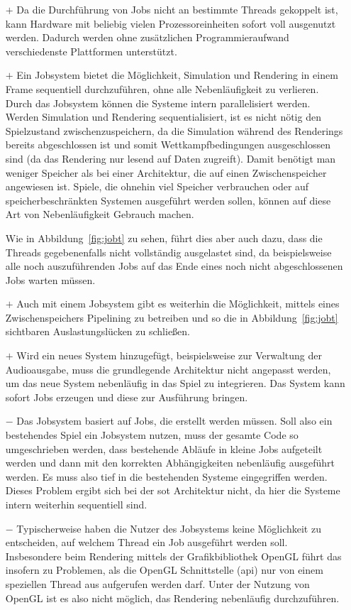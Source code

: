 \begin{itemize}
	\item[$+$]  Da die Durchführung von Jobs nicht an bestimmte Threads gekoppelt ist, kann Hardware mit beliebig vielen Prozessoreinheiten sofort voll ausgenutzt werden. Dadurch werden ohne zusätzlichen Programmieraufwand verschiedenste Plattformen unterstützt.
	\item[$+$] Ein Jobsystem bietet die Möglichkeit, Simulation und Rendering in einem Frame sequentiell durchzuführen, ohne alle Nebenläufigkeit zu verlieren. Durch das Jobsystem können die Systeme intern parallelisiert werden. Werden Simulation und Rendering sequentialisiert, ist es nicht nötig den Spielzustand zwischenzuspeichern, da die Simulation während des Renderings bereits abgeschlossen ist und somit Wettkampfbedingungen ausgeschlossen sind (da das Rendering nur lesend auf Daten zugreift). Damit benötigt man weniger Speicher als bei einer Architektur, die auf einen Zwischenspeicher angewiesen ist. Spiele, die ohnehin viel Speicher verbrauchen oder auf speicherbeschränkten Systemen ausgeführt werden sollen, können auf diese Art von Nebenläufigkeit Gebrauch machen. 
	
	Wie in Abbildung~\ref{fig:jobt} zu sehen, führt dies aber auch dazu, dass die Threads gegebenenfalls nicht vollständig ausgelastet sind, da beispielsweise alle noch auszuführenden Jobs auf das Ende eines noch nicht abgeschlossenen Jobs warten müssen.
	\item[$+$] Auch mit einem Jobsystem gibt es weiterhin die Möglichkeit, mittels eines Zwischenspeichers Pipelining zu betreiben und so die in Abbildung~\ref{fig:jobt} sichtbaren Auslastungslücken zu schließen.
	\item[$+$] Wird ein neues System hinzugefügt, beispielsweise zur Verwaltung der Audioausgabe, muss die grundlegende Architektur nicht angepasst werden, um das neue System nebenläufig in das Spiel zu integrieren. Das System kann sofort Jobs erzeugen und diese zur Ausführung bringen.
	\item[$-$] Das Jobsystem basiert auf Jobs, die erstellt werden müssen. Soll also ein bestehendes Spiel ein Jobsystem nutzen, muss der gesamte Code so umgeschrieben werden, dass bestehende Abläufe in kleine Jobs aufgeteilt werden und dann mit den korrekten Abhängigkeiten nebenläufig ausgeführt werden. Es muss also tief in die bestehenden Systeme eingegriffen werden. Dieses Problem ergibt sich bei der \ac{sot} Architektur nicht, da hier die Systeme intern weiterhin sequentiell sind.
	\item[$-$] Typischerweise haben die Nutzer des Jobsystems keine Möglichkeit zu entscheiden, auf welchem Thread ein Job ausgeführt werden soll. Insbesondere beim Rendering mittels der Grafikbibliothek OpenGL führt das insofern zu Problemen, als die OpenGL Schnittstelle (\acs{api}) nur von einem speziellen Thread aus aufgerufen werden darf. Unter der Nutzung von OpenGL ist es also nicht möglich, das Rendering nebenläufig durchzuführen.
\end{itemize}

